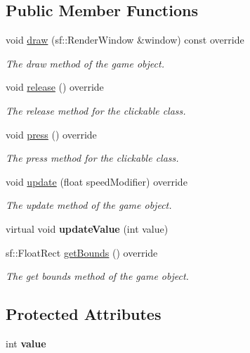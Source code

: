 \subsection*{Public Member Functions}
\begin{DoxyCompactItemize}
\item 
void \hyperlink{class_slider_a5693b04af04da09cff43647283efaf6e}{draw} (sf\+::\+Render\+Window \&window) const override
\begin{DoxyCompactList}\small\item\em The draw method of the game object. \end{DoxyCompactList}\item 
void \hyperlink{class_slider_ac1cb7218b21febfe4dffecc0055427ac}{release} () override
\begin{DoxyCompactList}\small\item\em The release method for the clickable class. \end{DoxyCompactList}\item 
void \hyperlink{class_slider_a39223f6d54b6a517dea6cd842d34ecd7}{press} () override
\begin{DoxyCompactList}\small\item\em The press method for the clickable class. \end{DoxyCompactList}\item 
void \hyperlink{class_slider_a762b3a7ca00a3a665a1aeceba2e54fac}{update} (float speed\+Modifier) override
\begin{DoxyCompactList}\small\item\em The update method of the game object. \end{DoxyCompactList}\item 
\hypertarget{class_slider_a5275d7ee0fa30d49b01a5f3ec376bcbe}{virtual void {\bfseries update\+Value} (int value)}\label{class_slider_a5275d7ee0fa30d49b01a5f3ec376bcbe}

\item 
sf\+::\+Float\+Rect \hyperlink{class_slider_a3ca5a06f3165d1bce77408f367abba50}{get\+Bounds} () override
\begin{DoxyCompactList}\small\item\em The get bounds method of the game object. \end{DoxyCompactList}\end{DoxyCompactItemize}
\subsection*{Protected Attributes}
\begin{DoxyCompactItemize}
\item 
\hypertarget{class_slider_a79e7ed51de2c2d9a70940fc40afa644c}{int {\bfseries value}}\label{class_slider_a79e7ed51de2c2d9a70940fc40afa644c}

\end{DoxyCompactItemize}
